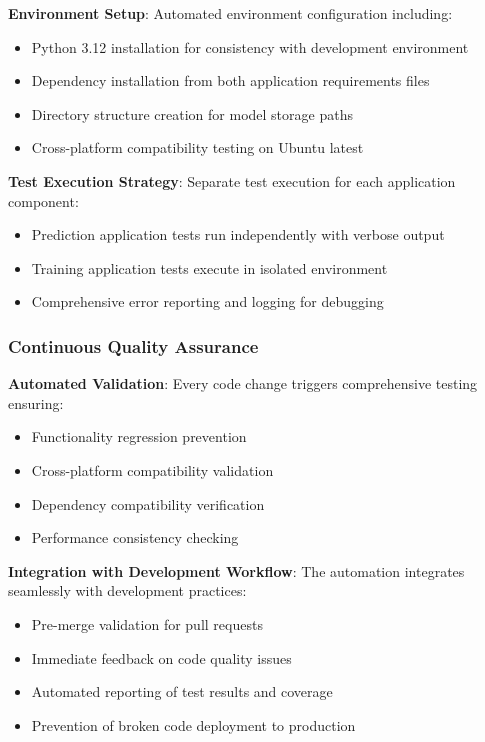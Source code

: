 \textbf{Environment Setup}: Automated environment configuration including:
\begin{itemize}
	\item Python 3.12 installation for consistency with development environment
	\item Dependency installation from both application requirements files
	\item Directory structure creation for model storage paths
	\item Cross-platform compatibility testing on Ubuntu latest
\end{itemize}

\textbf{Test Execution Strategy}: Separate test execution for each application component:
\begin{itemize}
	\item Prediction application tests run independently with verbose output
	\item Training application tests execute in isolated environment
	\item Comprehensive error reporting and logging for debugging
\end{itemize}

\subsubsection{Continuous Quality Assurance}

\textbf{Automated Validation}: Every code change triggers comprehensive testing ensuring:
\begin{itemize}
	\item Functionality regression prevention
	\item Cross-platform compatibility validation
	\item Dependency compatibility verification
	\item Performance consistency checking
\end{itemize}

\textbf{Integration with Development Workflow}: The automation integrates seamlessly with development practices:
\begin{itemize}
	\item Pre-merge validation for pull requests
	\item Immediate feedback on code quality issues
	\item Automated reporting of test results and coverage
	\item Prevention of broken code deployment to production
\end{itemize}


